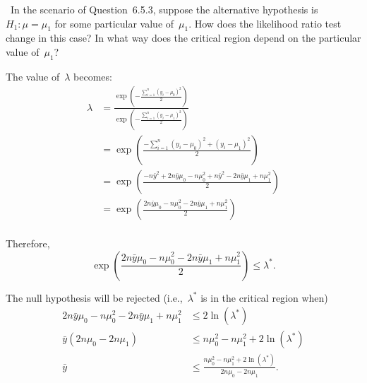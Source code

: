 \begin{problem}
  ~In the scenario of Question~6.5.3, suppose the alternative hypothesis is ${H_1: \mu = \mu_1}$ for some particular value of~$\mu_1$. How does the likelihood ratio test change in this case? In what way does the critical region depend on the particular value of~$\mu_1$?
\end{problem}

The value of~$\lambda$ becomes:
\begin{align}
  \lambda &= \frac{\exp\left( - \frac{\sum_{i=1}^{n} (y_i - \mu_0)^{2}}{2} \right) }{\exp\left( - \frac{\sum_{i=1}^{n} (y_i - \mu_1)^{2}}{2} \right) } \\
          &= \exp\left( \frac{ -\sum_{i=1}^{n} (y_i - \mu_0)^{2} + (y_i - \mu_1)^{2} }{2} \right) \\
          &= \exp\left( \frac{ -n\bar{y}^2 +2n\bar{y}\mu_0 - n\mu_0^{2} + n\bar{y}^2 - 2n\bar{y}\mu_1 + n\mu_1^{2} }{2} \right) \\
          &= \exp\left( \frac{ 2n\bar{y}\mu_0 - n\mu_0^{2} - 2n\bar{y}\mu_1 + n\mu_1^{2} }{2} \right) \\
\end{align}

Therefore,
\begin{equation}
  \exp\left( \frac{ 2n\bar{y}\mu_0 - n\mu_0^{2} - 2n\bar{y}\mu_1 + n\mu_1^{2} }{2} \right) \leq \lambda^* \text{.}
\end{equation}

The null hypothesis will be rejected (i.e.,~$\lambda^{*}$ is in the critical region when)
\begin{align}
  2n\bar{y}\mu_0 - n\mu_0^{2} - 2n\bar{y}\mu_1 + n\mu_1^{2} &\leq 2\ln (\lambda^*) \\
  \bar{y} (2n \mu_0 - 2n\mu_1) &\leq n\mu_0^{2} - n\mu_1^{2} + 2\ln (\lambda^*) \\
  \bar{y} &\leq \frac{n\mu_0^{2} - n\mu_1^{2} + 2\ln (\lambda^*)}{2n \mu_0 - 2n\mu_1} \text{.}
\end{align}
